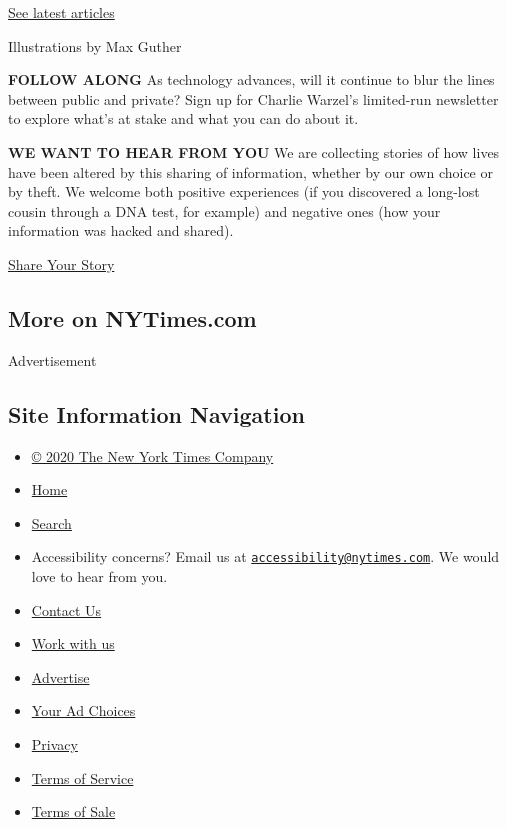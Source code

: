 \href{https://nytimes.com/spotlight/privacy-project-data-protection}{See
latest articles}

Illustrations by Max Guther

\textbf{FOLLOW ALONG} As technology advances, will it continue to blur
the lines between public and private? Sign up for Charlie Warzel's
limited-run newsletter to explore what's at stake and what you can do
about it.

\textbf{WE WANT TO HEAR FROM YOU} We are collecting stories of how lives
have been altered by this sharing of information, whether by our own
choice or by theft. We welcome both positive experiences (if you
discovered a long-lost cousin through a DNA test, for example) and
negative ones (how your information was hacked and shared).

\href{https://www.nytimes.com/2019/02/13/opinion/internet-privacy.html}{Share
Your Story}

\hypertarget{more-on-nytimescom}{%
\subsection{More on NYTimes.com}\label{more-on-nytimescom}}

Advertisement

\hypertarget{site-information-navigation}{%
\subsection{Site Information
Navigation}\label{site-information-navigation}}

\begin{itemize}
\tightlist
\item
  \href{https://help.nytimes.com/hc/en-us/articles/115014792127-Copyright-notice}{©
  2020 The New York Times Company}
\item
  \href{https://www.nytimes.com}{Home}
\item
  \href{https://www.nytimes.com/search/}{Search}
\item
  Accessibility concerns? Email us at
  \href{mailto:accessibility@nytimes.com}{\nolinkurl{accessibility@nytimes.com}}.
  We would love to hear from you.
\item
  \href{https://help.nytimes.com/hc/en-us/articles/115015385887-Contact-Us}{Contact
  Us}
\item
  \href{https://www.nytco.com/careers/}{Work with us}
\item
  \href{https://nytmediakit.com/}{Advertise}
\item
  \href{https://help.nytimes.com/hc/en-us/articles/115014892108-Privacy-policy\#pp}{Your
  Ad Choices}
\item
  \href{https://help.nytimes.com/hc/en-us/articles/115014892108-Privacy-policy}{Privacy}
\item
  \href{https://help.nytimes.com/hc/en-us/articles/115014893428-Terms-of-service}{Terms
  of Service}
\item
  \href{https://help.nytimes.com/hc/en-us/articles/115014893968-Terms-of-sale}{Terms
  of Sale}
\end{itemize}

